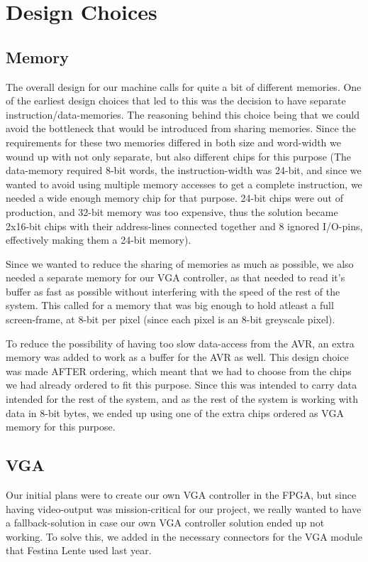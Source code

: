\section {Design Choices}

\subsection {Memory}
The overall design for our machine calls for quite a bit of different memories. One of the
earliest design choices that led to this was the decision to have separate instruction/data-memories.
The reasoning behind this choice being that we could avoid the bottleneck that would be introduced
from sharing memories. Since the requirements for these two memories differed in both size and word-width 
we wound up with not only separate, but also different chips for this purpose (The data-memory required
8-bit words, the instruction-width was 24-bit, and since we wanted to avoid using multiple memory accesses
to get a complete instruction, we needed a wide enough memory chip for that purpose. 24-bit chips were out of
production, and 32-bit memory was too expensive, thus the solution became 2x16-bit chips with their address-lines
connected together and 8 ignored I/O-pins, effectively making them a 24-bit memory).

Since we wanted to reduce the sharing of memories as much as possible, we also needed a separate memory for
our \ac{VGA} controller, as that needed to read it's buffer as fast as possible without interfering with the speed
of the rest of the system. This called for a memory that was big enough to hold atleast a full screen-frame,
at 8-bit per pixel (since each pixel is an 8-bit greyscale pixel).

To reduce the possibility of having too slow data-access from the AVR, an extra memory was added to work as
a buffer for the AVR as well. This design choice was made AFTER ordering, which meant that we had to choose from
the chips we had already ordered to fit this purpose. Since this was intended to carry data intended for the rest
of the system, and as the rest of the system is working with data in 8-bit bytes, we ended up using one of the
extra chips ordered as \ac{VGA} memory for this purpose.

\subsection{\ac{VGA}}
Our initial plans were to create our own \ac{VGA} controller in the \ac{FPGA}, but since having video-output was mission-critical
for our project, we really wanted to have a fallback-solution in case our own
\ac{VGA} controller solution ended up not working.
To solve this, we added in the necessary connectors for the \ac{VGA} module that Festina Lente used last year.

